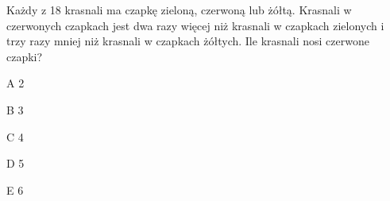 \begin{tresc}
Każdy z 18 krasnali ma czapkę zieloną, czerwoną lub żółtą. Krasnali w czerwonych czapkach jest dwa razy więcej niż krasnali w czapkach zielonych i trzy razy mniej niż krasnali w czapkach żółtych. Ile krasnali nosi czerwone czapki?
\end{tresc}
\begin{wariant}{A} 2 \end{wariant}
\begin{wariant}{B} 3 \end{wariant}
\begin{wariant}{C} 4 \end{wariant}
\begin{wariant}{D} 5 \end{wariant}
\begin{wariant}{E} 6 \end{wariant}
